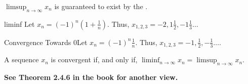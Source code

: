 \(\limsup_{n \to \infty} x_n\) is guaranteed to exist by the .

\begin{example}
    {liminf} Let \(x_n = (-1)^n(1 + \frac{1}{n})\). Thus, \(x_{1,2,3} = -2,1\frac{1}{2},-1\frac{1}{3}\dots\)
\end{example}

\begin{example}
    {Convergence Towards 0}Let \(x_n = (-1)^n\frac{1}{n}\). Thus, \(x_{1,2,3} = -1, \frac{1}{2}, -\frac{1}{3}\dots\).
\end{example}

\begin{theorem}
    A sequence \(x_n\) is convergent if, and only if, \(\liminf_{n \to \infty} x_n = \limsup_{n \to \infty} x_n\).
\end{theorem}

\textbf{See Theorem 2.4.6 in the book for another view.}




